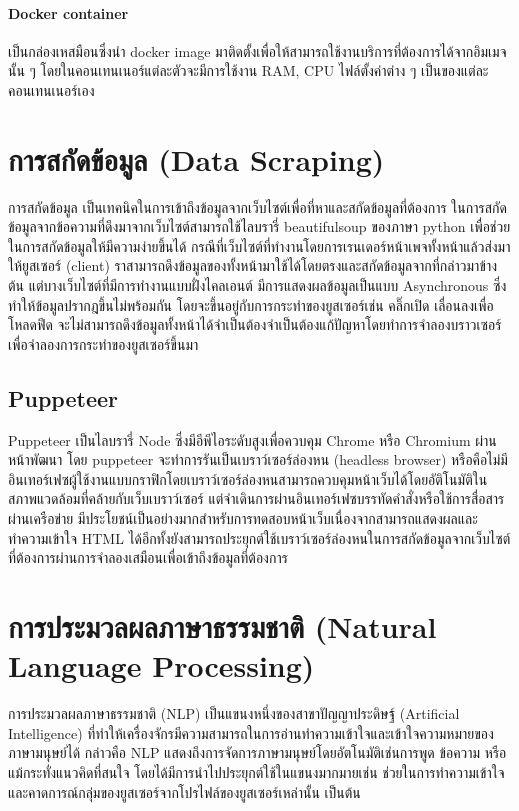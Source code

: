 \paragraph*{Docker container}
เป็นกล่องเหสมือนซึ่งนำ docker image มาติดตั้งเพื่อให้สามารถใช้งานบริการที่ต้องการได้จากอิมเมจนั้น ๆ โดยในคอนเทนเนอร์แต่ละตัวจะมีการใช้งาน RAM, CPU ไฟล์ตั้งค่าต่าง ๆ เป็นของแต่ละคอนเทนเนอร์เอง


\section{การสกัดข้อมูล (Data Scraping)}
การสกัดข้อมูล \cite{choochart} เป็นเทคนิคในการเข้าถึงข้อมูลจากเว็บไซต์เพื่อที่หาและสกัดข้อมูลที่ต้องการ ในการสกัดข้อมูลจากข้อความที่ดึงมาจากเว็บไซต์สามารถใช้ไลบรารี่ beautifulsoup ของภาษา python เพื่อช่วยในการสกัดข้อมูลให้มีความง่ายขึ้นได้ กรณีที่เว็บไซต์ที่ทำงานโดยการเรนเดอร์หน้าเพจทั้งหน้าแล้วส่งมาให้ยูสเซอร์ (client) ราสามารถดึงข้อมูลของทั้งหน้ามาใช้ได้โดยตรงและสกัดข้อมูลจากที่กล่าวมาข้างต้น แต่บางเว็บไซต์ที่มีการทำงานแบบฝั่งไคลเอนต์ มีการแสดงผลข้อมูลเป็นแบบ Asynchronous ซึ่งทำให้ข้อมูลปรากฎขึ้นไม่พร้อมกัน โดยจะขึ้นอยู่กับการกระทำของยูสเซอร์เช่น คลิ๊กเปิด เลื่อนลงเพื่อโหลดฟีด จะไม่สามารถดึงข้อมูลทั้งหน้าได้จำเป็นต้องจำเป็นต้องแก้ปัญหาโดยทำการจำลองบราวเซอร์เพื่อจำลองการกระทำของยูสเซอร์ขึ้นมา
\subsection{Puppeteer}
Puppeteer เป็นไลบรารี่ Node ซึ่งมีอีพีไอระดับสูงเพื่อควบคุม Chrome หรือ Chromium ผ่านหน้าพัฒนา โดย puppeteer จะทำการรันเป็นเบราว์เซอร์ล่องหน (headless browser) หรือคือไม่มีอินเทอร์เฟซผู้ใช้งานแบบกราฟิกโดยเบราว์เซอร์ล่องหนสามารถควบคุมหน้าเว็บได้โดยอัติโนมัติในสภาพแวดล้อมที่คล้ายกับเว็บเบราว์เซอร์ แต่จำเดินการผ่านอินเทอร์เฟซบรรทัดคำสั่งหรือใช้การสื่อสารผ่านเครือข่าย มีประโยชน์เป็นอย่างมากสำหรับการทดสอบหน้าเว็บเนื่องจากสามารถแสดงผลและทำความเข้าใจ HTML ได้อีกทั้งยังสามารถประยุกต์ใช้เบราว์เซอร์ล่องหนในการสกัดข้อมูลจากเว็บไซต์ที่ต้องการผ่านการจำลองเสมือนเพื่อเข้าถึงข้อมูลที่ต้องการ 


\section{การประมวลผลภาษาธรรมชาติ (Natural Language Processing)}
การประมวลผลภาษาธรรมชาติ (NLP) \cite{diego} เป็นแขนงหนึ่งของสาขาปัญญาประดิษฐ์ (Artificial Intelligence) ที่ทำให้เครื่องจักรมีความสามารถในการอ่านทำความเข้าใจและเข้าใจความหมายของภาษามนุษย์ได้ กล่าวคือ NLP แสดงถึงการจัดการภาษามนุษย์โดยอัตโนมัติเช่นการพูด ข้อความ หรือแม้กระทั่งแนวคิดที่สนใจ โดยได้มีการนำไปประยุกต์ใช้ในแขนงมากมายเช่น ช่วยในการทำความเข้าใจและคาดการณ์กลุ่มของยูสเซอร์จากโปรไฟล์ของยูสเซอร์เหล่านั้น เป็นต้น

